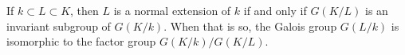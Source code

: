 If $k \subset L \subset K$, then $L$ is a normal extension of $k$ if and only if $G(K/L)$ is an invariant subgroup of $G(K/k)$. When that is so, the Galois group $G(L/k)$ is isomorphic to the factor group $G(K/k)/G(K/L)$.
